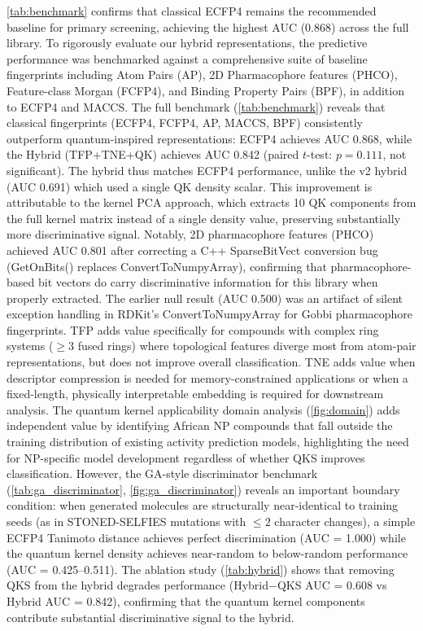 \documentclass[11pt,a4paper]{article}
\begin{document}
\cref{tab:benchmark} confirms that classical ECFP4 remains the recommended baseline for primary screening, achieving the highest AUC (0.868) across the full library. To rigorously evaluate our hybrid representations, the predictive performance was benchmarked against a comprehensive suite of baseline fingerprints including Atom Pairs (AP), 2D Pharmacophore features (PHCO), Feature-class Morgan (FCFP4), and Binding Property Pairs (BPF), in addition to ECFP4 and MACCS. The full benchmark (\cref{tab:benchmark}) reveals that classical fingerprints (ECFP4, FCFP4, AP, MACCS, BPF) consistently outperform quantum-inspired representations: ECFP4 achieves AUC 0.868, while the Hybrid (TFP+TNE+QK) achieves AUC 0.842 (paired $t$-test: $p = \num{0.111}$, not significant). The hybrid thus matches ECFP4 performance, unlike the v2 hybrid (AUC 0.691) which used a single QK density scalar. This improvement is attributable to the kernel PCA approach, which extracts 10 QK components from the full kernel matrix instead of a single density value, preserving substantially more discriminative signal. Notably, 2D pharmacophore features (PHCO) achieved AUC 0.801 after correcting a C++ SparseBitVect conversion bug (GetOnBits() replaces ConvertToNumpyArray), confirming that pharmacophore-based bit vectors do carry discriminative information for this library when properly extracted. The earlier null result (AUC 0.500) was an artifact of silent exception handling in RDKit's ConvertToNumpyArray for Gobbi pharmacophore fingerprints. TFP adds value specifically for compounds with complex ring systems ($\geq 3$ fused rings) where topological features diverge most from atom-pair representations, but does not improve overall classification. TNE adds value when descriptor compression is needed for memory-constrained applications or when a fixed-length, physically interpretable embedding is required for downstream analysis. The quantum kernel applicability domain analysis (\cref{fig:domain}) adds independent value by identifying African NP compounds that fall outside the training distribution of existing activity prediction models, highlighting the need for NP-specific model development regardless of whether QKS improves classification. However, the GA-style discriminator benchmark (\cref{tab:ga_discriminator}, \cref{fig:ga_discriminator}) reveals an important boundary condition: when generated molecules are structurally near-identical to training seeds (as in STONED-SELFIES mutations with $\leq 2$ character changes), a simple ECFP4 Tanimoto distance achieves perfect discrimination (AUC = \num{1.000}) while the quantum kernel density achieves near-random to below-random performance (AUC = \numrange{0.425}{0.511}). The ablation study (\cref{tab:hybrid}) shows that removing QKS from the hybrid degrades performance (Hybrid$-$QKS AUC = 0.608 vs Hybrid AUC = 0.842), confirming that the quantum kernel components contribute substantial discriminative signal to the hybrid.
\end{document}

